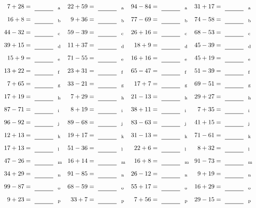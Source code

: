 \documentclass
[
  draft    = true,
  fontsize = 11pt,
  parskip  = half-
]
{scrartcl}
\begin{document}
\clearpage
\begin{align*}
    \pline{7+28}&=\rline{a}
  & \pline{22+59}&=\rline{a}
  & \pline{94-84}&=\rline{a}
  & \pline{31+17}&=\rline{a} \\[1ex]
    \pline{16+8}&=\rline{b}
  & \pline{9+36}&=\rline{b}
  & \pline{77-69}&=\rline{b}
  & \pline{74-58}&=\rline{b} \\[1ex]
    \pline{44-32}&=\rline{c}
  & \pline{59-39}&=\rline{c}
  & \pline{26+16}&=\rline{c}
  & \pline{68-53}&=\rline{c} \\[1ex]
    \pline{39+15}&=\rline{d}
  & \pline{11+37}&=\rline{d}
  & \pline{18+9}&=\rline{d}
  & \pline{45-39}&=\rline{d} \\[1ex]
    \pline{15+9}&=\rline{e}
  & \pline{71-55}&=\rline{e}
  & \pline{16+16}&=\rline{e}
  & \pline{45+19}&=\rline{e} \\[1ex]
    \pline{13+22}&=\rline{f}
  & \pline{23+31}&=\rline{f}
  & \pline{65-47}&=\rline{f}
  & \pline{51-39}&=\rline{f} \\[1ex]
    \pline{7+65}&=\rline{g}
  & \pline{33-21}&=\rline{g}
  & \pline{17+7}&=\rline{g}
  & \pline{69-51}&=\rline{g} \\[1ex]
    \pline{17+19}&=\rline{h}
  & \pline{7+29}&=\rline{h}
  & \pline{21-13}&=\rline{h}
  & \pline{29+27}&=\rline{h} \\[1ex]
    \pline{87-71}&=\rline{i}
  & \pline{8+19}&=\rline{i}
  & \pline{38+11}&=\rline{i}
  & \pline{7+35}&=\rline{i} \\[1ex]
    \pline{96-92}&=\rline{j}
  & \pline{89-68}&=\rline{j}
  & \pline{83-63}&=\rline{j}
  & \pline{41+15}&=\rline{j} \\[1ex]
    \pline{12+13}&=\rline{k}
  & \pline{19+17}&=\rline{k}
  & \pline{31-13}&=\rline{k}
  & \pline{71-61}&=\rline{k} \\[1ex]
    \pline{17+13}&=\rline{l}
  & \pline{51-36}&=\rline{l}
  & \pline{22+6}&=\rline{l}
  & \pline{8+32}&=\rline{l} \\[1ex]
    \pline{47-26}&=\rline{m}
  & \pline{16+14}&=\rline{m}
  & \pline{16+8}&=\rline{m}
  & \pline{91-73}&=\rline{m} \\[1ex]
    \pline{34+29}&=\rline{n}
  & \pline{91-85}&=\rline{n}
  & \pline{26-12}&=\rline{n}
  & \pline{9+19}&=\rline{n} \\[1ex]
    \pline{99-87}&=\rline{o}
  & \pline{68-59}&=\rline{o}
  & \pline{55+17}&=\rline{o}
  & \pline{16+29}&=\rline{o} \\[1ex]
    \pline{9+23}&=\rline{p}
  & \pline{33+7}&=\rline{p}
  & \pline{7+56}&=\rline{p}
  & \pline{29-15}&=\rline{p}
\end{align*}
\end{document}
